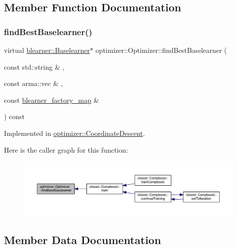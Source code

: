 \subsection{Member Function Documentation}
\mbox{\label{classoptimizer_1_1_optimizer_a134c7b34ed868231fbab53e9ebfa8fd8}} 
\subsubsection{\texorpdfstring{find\+Best\+Baselearner()}{findBestBaselearner()}}
{\footnotesize\ttfamily virtual \hyperlink{classblearner_1_1_baselearner}{blearner\+::\+Baselearner}$\ast$ optimizer\+::\+Optimizer\+::find\+Best\+Baselearner (\begin{DoxyParamCaption}\item[{const std\+::string \&}]{,  }\item[{const arma\+::vec \&}]{,  }\item[{const \hyperlink{baselearner__factory__list_8h_a058570e00ae11b882cfed36eb40be025}{blearner\+\_\+factory\+\_\+map} \&}]{ }\end{DoxyParamCaption}) const\hspace{0.3cm}{\ttfamily [pure virtual]}}



Implemented in \hyperlink{classoptimizer_1_1_coordinate_descent_af5e8a9fb18b1f627b20534b372d62a6e}{optimizer\+::\+Coordinate\+Descent}.

Here is the caller graph for this function\+:\nopagebreak
\begin{figure}[H]
\begin{center}
\leavevmode
\includegraphics[width=350pt]{classoptimizer_1_1_optimizer_a134c7b34ed868231fbab53e9ebfa8fd8_icgraph}
\end{center}
\end{figure}


\subsection{Member Data Documentation}
\mbox{\label{classoptimizer_1_1_optimizer_a93f8af0ef81986bc208cab5e3cc2ba31}} 

